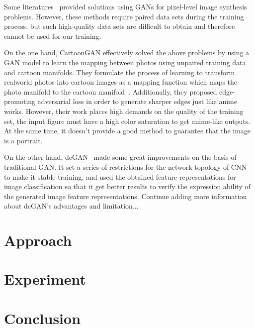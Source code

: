 \documentclass[10pt,twocolumn,letterpaper]{article}
\begin{document}
Some literatures~\cite{dumoulin2016adversarially,isola2017image,karacan2016learning} provided solutions using GANs for pixel-level image
synthesis problems. However, these methods require paired data sets
during the training process, but such high-quality data sets are
difficult to obtain and therefore cannot be used for our training.

On the one hand, CartoonGAN effectively solved the above problems by using a GAN model
to learn the mapping between photos using unpaired training data and
cartoon manifolds. They formulate the process of learning to transform realworld
photos into cartoon images as a mapping function which maps the photo
manifold to the cartoon manifold~\cite{CartoonGAN}. Additionally, they proposed
edge-promoting adversarial loss in order to generate sharper edges just like anime works.
However, their work places high demands on the quality of the training set, the input
figure must have a high color saturation to get anime-like outputs. At the same time,
it doesn't provide a good method to guarantee that the image is a portrait.

On the other hand, dcGAN~\cite{dcGAN} made some great improvements on the basis of traditional GAN.
It set a series of restrictions for the network topology of CNN to make it stable training, and
used the obtained feature representations for image classification so that it get better results
to verify the expression ability of the generated image feature representations.
{\color{red}Continue adding more information about dcGAN's advantages and limitation...}


\section{Approach}



\section{Experiment}

\section{Conclusion}

{\small


}
\end{document}

